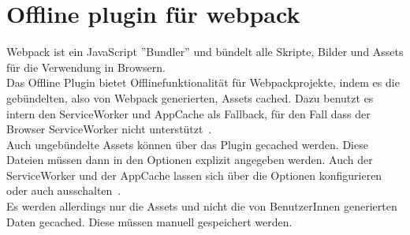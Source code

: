 \section{Offline plugin für webpack}
Webpack ist ein JavaScript ''Bundler'' und bündelt alle Skripte, Bilder und \gls{Assets} für die Verwendung in Browsern.\\
Das Offline Plugin bietet Offlinefunktionalität für Webpackprojekte, indem es die gebündelten, also von Webpack generierten, \gls{Assets} cached.
Dazu benutzt es intern den ServiceWorker und AppCache als Fallback, für den Fall dass der Browser ServiceWorker nicht unterstützt~\cite{webpack-gh}.\\
Auch ungebündelte \gls{Assets} können über das Plugin gecached werden. Diese Dateien müssen dann in den Optionen explizit angegeben werden. Auch der ServiceWorker und der AppCache lassen sich über die Optionen konfigurieren oder auch ausschalten~\cite{webpack-opt}.\\
Es werden allerdings nur die \gls{Assets} und nicht die von BenutzerInnen generierten Daten gecached. Diese müssen manuell gespeichert werden.